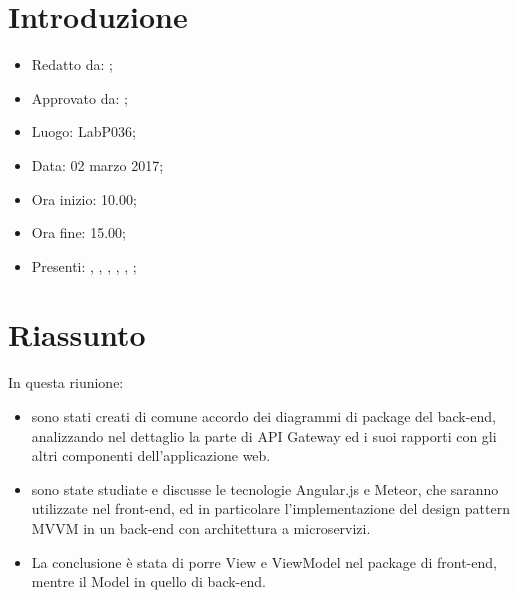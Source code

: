 \section{Introduzione}

	\begin{itemize}
		\item Redatto da: \MC;
		\item Approvato da: \AS;
		\item Luogo: LabP036;
		\item Data: 02 marzo 2017;
		\item Ora inizio: 10.00;
		\item Ora fine: 15.00;
		\item Presenti: \AN, \AS, \DAN, \DS, \MC, \NS;	
	\end{itemize}

\section{Riassunto}
In questa riunione:

\begin{itemize}
	\item sono stati creati di comune accordo dei diagrammi di package del back-end, analizzando nel dettaglio la parte di API Gateway ed i suoi rapporti con gli altri componenti dell'applicazione web.
	\item  sono state studiate e discusse le tecnologie Angular.js e Meteor, che saranno utilizzate nel front-end, ed in particolare l'implementazione del design pattern MVVM in un back-end con architettura a microservizi.
	\item La conclusione è stata di porre View e ViewModel nel package di front-end, mentre il Model in quello di back-end.
\end{itemize}
